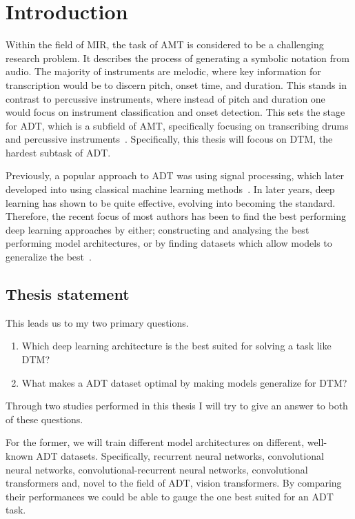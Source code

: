\chapter{Introduction}

Within the field of \gls{MIR}, the task of \gls{AMT} is considered to be a challenging research problem. It describes the process of generating a symbolic notation from audio. The majority of instruments are melodic, where key information for transcription would be to discern pitch, onset time, and duration. This stands in contrast to percussive instruments, where instead of pitch and duration one would focus on instrument classification and onset detection. This sets the stage for \gls{ADT}, which is a subfield of \gls{AMT}, specifically focusing on transcribing drums and percussive instruments~\cite{8350302}. Specifically, this thesis will focous on \gls{DTM}, the hardest subtask of \gls{ADT}.

Previously, a popular approach to \gls{ADT} was using signal processing, which later developed into using classical machine learning methods~\cite{8350302}. In later years, deep learning has shown to be quite effective, evolving into becoming the standard. Therefore, the recent focus of most authors has been to find the best performing deep learning approaches by either; constructing and analysing the best performing model architectures, or by finding datasets which allow models to generalize the best~\cite{signals4040042}.

\section{Thesis statement}

This leads us to my two primary questions. 
\begin{enumerate}
    \item Which deep learning architecture is the best suited for solving a task like \gls{DTM}?
    \item What makes a \gls{ADT} dataset optimal by making models generalize for \gls{DTM}?
\end{enumerate}

Through two studies performed in this thesis I will try to give an answer to both of these questions.

For the former, we will train different model architectures on different, well-known \gls{ADT} datasets. Specifically, recurrent neural networks, convolutional neural networks, convolutional-recurrent neural networks, convolutional transformers and, novel to the field of \gls{ADT}, vision transformers. By comparing their performances we could be able to gauge the one best suited for an \gls{ADT} task.

